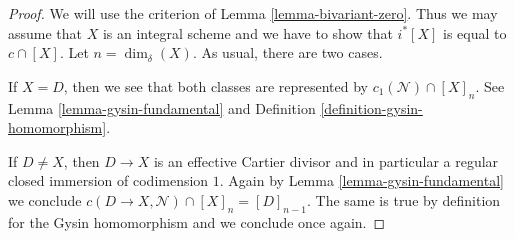 \documentclass[10pt,a4paper]{amsart}
\theoremstyle{plain}
\theoremstyle{definition}
\theoremstyle{remark}
\numberwithin{equation}{subsection}
\begin{document}
\begin{proof}
We will use the criterion of Lemma \ref{lemma-bivariant-zero}.
Thus we may assume that $X$ is an integral scheme and
we have to show that $i^*[X]$ is equal to $c \cap [X]$.
Let $n = \dim_\delta(X)$. As usual, there are two cases.

\medskip\noindent
If $X = D$, then we see that both classes are represented by
$c_1(\mathcal{N}) \cap [X]_n$. See Lemma \ref{lemma-gysin-fundamental}
and Definition \ref{definition-gysin-homomorphism}.

\medskip\noindent
If $D \not = X$, then $D \to X$ is an effective Cartier divisor
and in particular a regular closed immersion of codimension $1$.
Again by Lemma \ref{lemma-gysin-fundamental} we conclude
$c(D \to X, \mathcal{N}) \cap [X]_n = [D]_{n - 1}$. The same
is true by definition for the Gysin homomorphism and we conclude
once again.
\end{proof}
\end{document}
